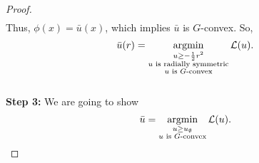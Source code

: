 \begin{proof}
\begin{equation*}
\begin{split}
	\end{split}
	\end{equation*}
	Thus, $\phi(x) = \bar{u}(x)$, which implies $\bar{u}$ is $G$-convex. So,
	\begin{equation*}
	\bar{u}(r)= \argmin\limits_{\substack{u\ge -\frac{1}{2}r^2 \\ u \text{ is radially symmetric} \\ u \text{ is $G$-convex}}} \mathcal{L}(u).
	\end{equation*}\\
	
	{\bf Step 3:} We are going to show
	\begin{equation*}
	\bar{u}=\argmin\limits_{\substack{u\ge u_{\emptyset} \\ u \text{ is $G$-convex}}} \mathcal{L}(u) .
	\end{equation*}


\end{proof}
